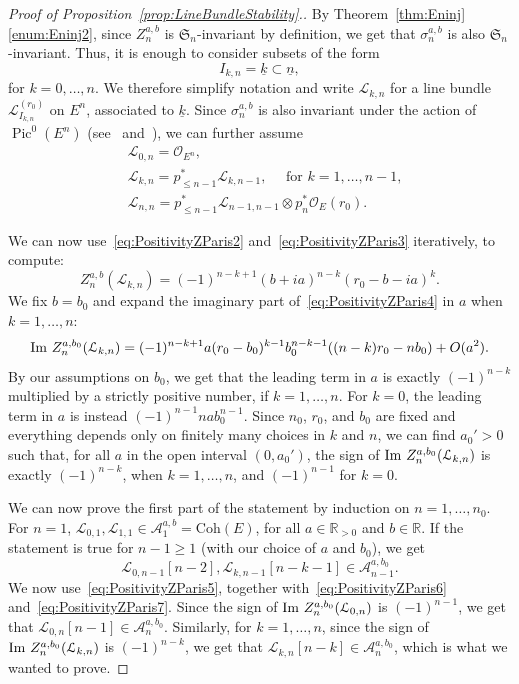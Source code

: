 \documentclass[11pt, reqno]{amsart}
\numberwithin{equation}{section}
\theoremstyle{plain}
\theoremstyle{remark}
\theoremstyle{definition}
\theoremstyle{italicsname}
\def\Im{\mathop{\rm Im}\nolimits}
\newcommand{\Coh}{\mathrm{Coh}}
\DeclareMathOperator{\Pic}{Pic}
\newcommand{\cO}{\mathcal{O}}
\newcommand{\cL}{\mathcal{L}}
\newcommand{\cA}{\mathscr{A}}
\newcommand{\fS}{\mathfrak{S}}
\def\RR{\ensuremath{\mathbb{R}}}
\begin{document}
\begin{proof}[Proof of Proposition~\ref{prop:LineBundleStability}.]
By Theorem~\ref{thm:Eninj}\ref{enum:Eninj2}, since $Z^{a,b}_{n}$ is $\fS_{n}$-invariant by definition, we get that $\sigma^{a,b}_{n}$ is also $\fS_{n}$-invariant.
Thus, it is enough to consider subsets of the form
\[
I_{k,n}=\underline{k}\subset\underline{n},
\]
for $k=0,\dots,n$. 
We therefore simplify notation and write $\cL_{k,n}$ for a line bundle $\cL_{I_{k,n}}^{(r_0)}$ on $E^n$, associated to $\underline{k}$. 
Since $\sigma^{a,b}_{n}$ is also invariant under the action of $\Pic^0(E^{n})$ (see~\cite[Theorem 3.5.1]{P-t-structures} and~\cite[Theorem 2.23]{curves}), we can further assume
\begin{equation}\label{eq:PositivityZParis5}
\begin{split}
&\cL_{0,n}=\cO_{E^{n}},\\
&\cL_{k,n}=p_{\leq n-1}^*\cL_{k,n-1},\quad \text{ for } k=1,\dots,n-1,\\
&\cL_{n,n}=p_{\leq n-1}^*\cL_{n-1,n-1}\otimes p_{n}^*\cO_E(r_0).
\end{split}
\end{equation}

We can now use~\eqref{eq:PositivityZParis2} and~\eqref{eq:PositivityZParis3} iteratively, to compute:
\begin{equation}\label{eq:PositivityZParis4}
Z_{n}^{a,b}(\cL_{k,n})=(-1)^{n-k+1}(b+ia)^{n-k}(r_0-b-ia)^{k}.    
\end{equation}
We fix $b=b_0$ and expand the imaginary part of~\eqref{eq:PositivityZParis4} in $a$ when $k=1,\dots,n$:
\[
\Im\, Z_{n}^{a,b_0}(\cL_{k,n})=(-1)^{n-k+1}a(r_0-b_0)^{k-1}b_0^{n-k-1}((n-k)r_0-nb_0)+O(a^2).
\]
By our assumptions on $b_0$, we get that the leading term in $a$ is exactly $(-1)^{n-k}$ multiplied by a strictly positive number, if $k=1,\dots,n$.
For $k=0$, the leading term in $a$ is instead $(-1)^{n-1}nab^{n-1}_0$.
Since $n_0$, $r_0$, and $b_0$ are fixed and everything depends only on finitely many choices in $k$ and $n$, we can find $a_0'>0$ such that, for all $a$ in the open interval $(0,a_0')$, the sign of $\Im\, Z_{n}^{a,b_0}(\cL_{k,n})$ is exactly $(-1)^{n-k}$, when $k=1,\dots,n$, and $(-1)^{n-1}$ for $k=0$.

We can now prove the first part of the statement by induction on $n=1,\dots,n_0$.
For $n=1$, $\cL_{0,1},\cL_{1,1}\in\cA^{a,b}_1=\Coh(E)$, for all $a\in\RR_{>0}$ and $b\in\RR$.
If the statement is true for $n-1\geq1$ (with our choice of $a$ and $b_0$), we get
\[
\cL_{0,n-1}[n-2],\cL_{k,n-1}[n-k-1]\in\cA_{n-1}^{a,b_0}.
\]
We now use~\eqref{eq:PositivityZParis5}, together with~\eqref{eq:PositivityZParis6} and~\eqref{eq:PositivityZParis7}.
Since the sign of $\Im\, Z_{n}^{a,b_0}(\cL_{0,n})$ is $(-1)^{n-1}$, we get that $\cL_{0,n}[n-1]\in\cA_n^{a,b_0}$.
Similarly, for $k=1,\dots,n$, since the sign of $\Im\, Z_{n}^{a,b_0}(\cL_{k,n})$ is $(-1)^{n-k}$, we get that $\cL_{k,n}[n-k]\in\cA_n^{a,b_0}$, which is what we wanted to prove.


\end{proof}
\end{document}

